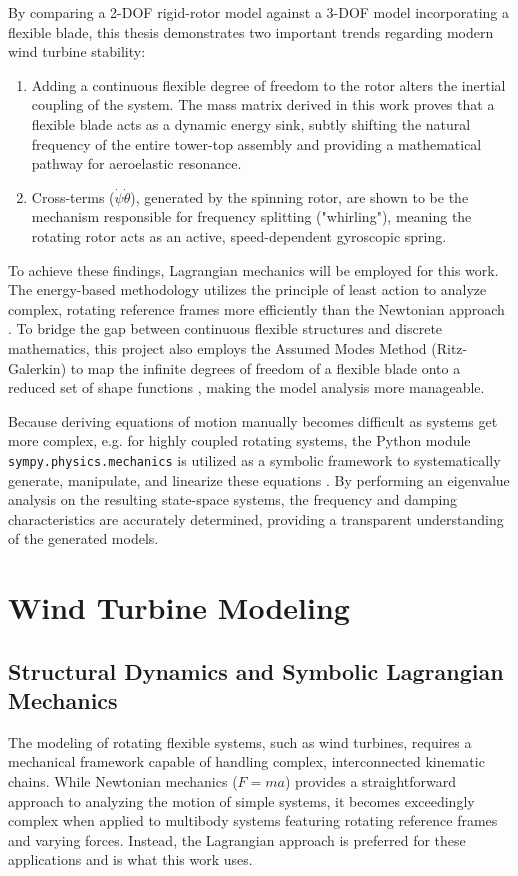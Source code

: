 \documentclass[final,onecolumn]{IEEEtran}
\begin{document}
By comparing a 2-DOF rigid-rotor model against a 3-DOF model incorporating a flexible blade, this thesis demonstrates two important trends regarding modern wind turbine stability:
\begin{enumerate}
    \item Adding a continuous flexible degree of freedom to the rotor alters the inertial coupling of the system. The mass matrix derived in this work proves that a flexible blade acts as a dynamic energy sink, subtly shifting the natural frequency of the entire tower-top assembly and providing a mathematical pathway for aeroelastic resonance.
    \item Cross-terms ($\dot{\psi}\dot{\theta}$), generated by the spinning rotor, are shown to be the mechanism responsible for frequency splitting ("whirling"), meaning the rotating rotor acts as an active, speed-dependent gyroscopic spring.
\end{enumerate}

To achieve these findings, Lagrangian mechanics will be employed for this work. The energy-based methodology utilizes the principle of least action to analyze complex, rotating reference frames more efficiently than the Newtonian approach \cite{Branlard2025notes}. To bridge the gap between continuous flexible structures and discrete mathematics, this project also employs the Assumed Modes Method (Ritz-Galerkin) to map the infinite degrees of freedom of a flexible blade onto a reduced set of shape functions \cite{branlard2019flexible}, making the model analysis more manageable.

Because deriving equations of motion manually becomes difficult as systems get more complex, e.g. for highly coupled rotating systems, the Python module \texttt{sympy.physics.mechanics} is utilized as a symbolic framework to systematically generate, manipulate, and linearize these equations \cite{branlard2022symbolic}. By performing an eigenvalue analysis on the resulting state-space systems, the frequency and damping characteristics are accurately determined, providing a transparent understanding of the generated models.

\section{Wind Turbine Modeling}

\subsection{Structural Dynamics and Symbolic Lagrangian Mechanics}
The modeling of rotating flexible systems, such as wind turbines, requires a mechanical framework capable of handling complex, interconnected kinematic chains. While Newtonian mechanics ($F = ma$) provides a straightforward approach to analyzing the motion of simple systems, it becomes exceedingly complex when applied to multibody systems featuring rotating reference frames and varying forces. Instead, the Lagrangian approach is preferred for these applications \cite{Branlard2025notes} and is what this work uses.
\end{document}
